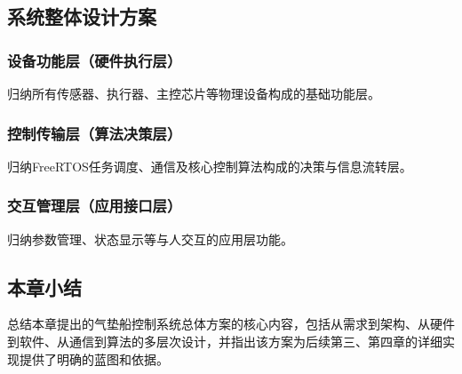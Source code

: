 \subsection{系统整体设计方案}
\subsubsection{设备功能层（硬件执行层）} %
归纳所有传感器、执行器、主控芯片等物理设备构成的基础功能层。
\subsubsection{控制传输层（算法决策层）} %
归纳FreeRTOS任务调度、通信及核心控制算法构成的决策与信息流转层。
\subsubsection{交互管理层（应用接口层）} %
归纳参数管理、状态显示等与人交互的应用层功能。

\subsection{本章小结}
总结本章提出的气垫船控制系统总体方案的核心内容，包括从需求到架构、从硬件到软件、从通信到算法的多层次设计，并指出该方案为后续第三、第四章的详细实现提供了明确的蓝图和依据。